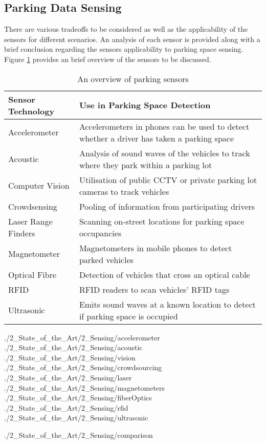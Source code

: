 \subsection{Parking Data Sensing}
There are various tradeoffs to be considered as well as the applicability of the sensors for different scenarios. An analysis of each sensor is provided along with a brief conclusion regarding the sensors applicability to parking space sensing. Figure \ref{table:sensor_description} provides an brief overview of the sensors to be discussed.

\begin{table}[H]
    \begin{center}
        \begin{tabularx}{\textwidth}{l|p{10cm}}
            \textbf{Sensor Technology} & \textbf{Use in Parking Space Detection} \\
            \hline
            Accelerometer & Accelerometers in phones can be used to detect whether a driver has taken a parking space \\ \hline
            Acoustic & Analysis of sound waves of the vehicles to track where they park within a parking lot \\ \hline
            Computer Vision & Utilisation of public CCTV or private parking lot cameras to track vehicles \\ \hline
            Crowdsensing & Pooling of information from participating drivers \\ \hline
            Laser Range Finders & Scanning on-street locations for parking space occupancies \\ \hline
            Magnetometer & Magnetometers in mobile phones to detect parked vehicles \\ \hline
            Optical Fibre & Detection of vehicles that cross an optical cable \\ \hline
            \ac{RFID} & \ac{RFID} readers to scan vehicles' \ac{RFID} tags \\ \hline
            Ultrasonic & Emits sound waves at a known location to detect if parking space is occupied \\ 
        \end{tabularx}
    \caption{An overview of parking sensors}
    \label{table:sensor_description}
    \end{center}
\end{table}

{./2_State_of_the_Art/2_Sensing/accelerometer}
{./2_State_of_the_Art/2_Sensing/acoustic}
{./2_State_of_the_Art/2_Sensing/vision}
{./2_State_of_the_Art/2_Sensing/crowdsourcing}
{./2_State_of_the_Art/2_Sensing/laser}
{./2_State_of_the_Art/2_Sensing/magnetometers}
{./2_State_of_the_Art/2_Sensing/fiberOptics}
{./2_State_of_the_Art/2_Sensing/rfid}
{./2_State_of_the_Art/2_Sensing/ultrasonic}

{./2_State_of_the_Art/2_Sensing/comparison}
